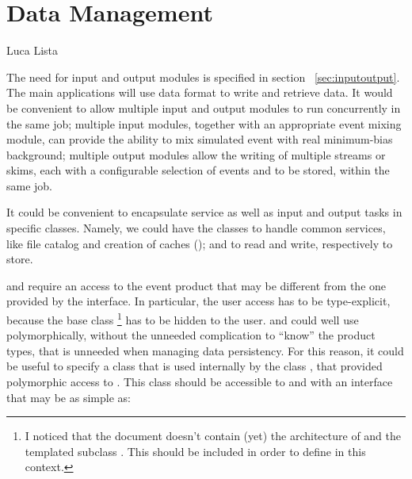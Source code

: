 \documentclass[draftmode]{memarticle}
\newcommand{\Pool}{\productname{Pool}}
\newcommand{\EDProduct}{\classname{ED\-Product}}
\begin{document}
\section{Data Management}
\begin{signednote}{Luca Lista}

The need for input and output modules 
is specified in section ~\vref{sec:inputoutput}.
The main applications 
will use \Pool data format 
to write and retrieve data.
It would be convenient to allow 
multiple input and output modules 
to run concurrently in the same job;
multiple input modules, 
together with an appropriate event mixing module,
can provide the ability to mix simulated event
with real minimum-bias background;
multiple output modules 
allow the writing of multiple streams or skims,
each with a configurable selection of events
and \EDProduct to be stored,
within the same job. 

It could be convenient 
to encapsulate \Pool service 
as well as input and output tasks
in specific classes.
Namely, we could have the classes 
to handle common services, 
like file catalog and creation of caches 
();
 and  
to read and write,
respectively to \Pool store.

 and  require an access to the event product 
that may be different from the one provided by the  interface. In particular, 
the user access has to be type-explicit, because the base class 
\footnote{I noticed that the document doesn't contain (yet) 
the architecture of  and the templated subclass 
. This should be included in order to define
 in this context.} has to be hidden to the user.
 and  could well use 
polymorphically, without the unneeded complication to ``know'' the product
types, that is unneeded when managing data persistency.
For this reason, it could be useful to specify a class  that is 
used internally by the class , that provided polymorphic 
access to . This class should be accessible to 
 and  with an interface that
may be as simple as:




\end{signednote}
\end{document}
